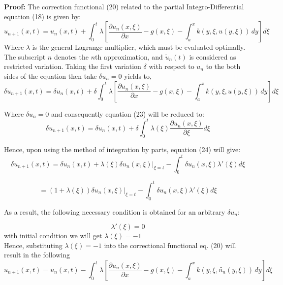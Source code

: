 \documentclass[12pt, a4paper]{report}
\begin{document}
\textbf{Proof:}
The correction functional (20) related to the partial Integro-Differential equation (18) is given by:
\begin{equation}
    u_{n+1}(x,t) =  u_n(x,t) + \int_{0}^{t} \lambda \left[ \frac{\partial u_n(x,\xi)}{\partial x} - g(x,\xi) - \int_{a}^{x} k(y,\xi,u(y,\xi)) \, dy \right] d\xi
\end{equation}
Where \( \lambda \) is the general Lagrange multiplier, which must be evaluated optimally. The subscript \( n \) denotes the \( n \)th approximation, and \( \tilde{u}_n(t) \) is considered as restricted variation.
Taking the first variation $\delta $ with respect to $u_n$ to the both sides of the equation then take $\delta u_n = 0 $ yields to,
\begin{equation}
   \delta u_{n+1}(x,t) =  \delta u_n(x,t) + \delta \int_{0}^{t} \lambda \left[ \frac{\partial u_n(x,\xi)}{\partial x} - g(x,\xi) - \int_{a}^{x} k(y,\xi,u(y,\xi)) \, dy \right] d\xi
\end{equation}

Where \( \delta u_n = 0 \) and consequently equation (23) will be reduced to:
\begin{equation}
    \delta u_{n+1}(x,t) = \delta u_n(x,t) + \delta \int_{0}^{t} \lambda(\xi) \frac{\partial u_n(x,\xi)}{\partial \xi} d\xi
\end{equation}


Hence, upon using the method of integration by parts, equation (24) will give:
\begin{equation}
     \delta u_{n+1}(x,t) = \delta u_n(x,t) + \lambda(\xi) \delta u_n(x,\xi) \bigg|_{\xi=t} - \int_{0}^{t} \delta u_n(x,\xi) \lambda'(\xi) d\xi 
\end{equation}

\begin{equation}
     = (1 + \lambda(\xi)) \delta u_n(x,\xi) \bigg|_{\xi=t} - \int_{0}^{t} \delta u_n(x,\xi) \lambda'(\xi) d\xi 
\end{equation}


As a result, the following necessary condition is obtained for an arbitrary \( \delta u_n \):

\begin{equation}
    \lambda'(\xi) = 0 
\end{equation} 
with initial condition we will get $\lambda(\xi) = -1 $ \\
Hence, substituting $\lambda(\xi) = -1 $ into the correctional functional eq. (20) will result in the following
\begin{equation}
    u_{n+1}(x,t) =  u_n(x,t) - \int_{0}^{t} \lambda \left[ \frac{\partial u_n(x,\xi)}{\partial x} - g(x,\xi) - \int_{a}^{x} k(y,\xi,\tilde{u_n}(y,\xi)) \, dy \right] d\xi
\end{equation}
\end{document}
